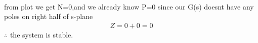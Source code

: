 \begin{enumerate}[label=\thesection.\arabic*.,ref=\thesection.\theenumi]
\begin{tabular}{ |p{4cm}||p{4cm}|  }
 \hline
\end{tabular}
\\ 
\newline from plot we get N=0,and we already know P=0 since our G(s) doesnt have any poles on right half of s-plane
\begin{align}
Z=0+0=0
\end{align}
$\therefore$ the system is stable.



\end{enumerate}
